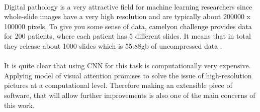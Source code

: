 \paragraph{}
Digital pathology is a very attractive field for machine learning researchers
since whole-slide images have a very high resolution and are typically about 200000 x 100000 pixels.
To give you some sense of data, camelyon challenge provides data for 200 patients,
where each patient has 5 different slides. It means that in total they release
about 1000 slides which is 55.88gb of uncompressed data \cite{CAMEL}.

\paragraph{}
It is quite clear that using CNN for this task is computationally very expensive.
Applying model of visual attention promises to solve the issue of
high-resolution pictures at a computational level.
Therefore making an extensible piece of software, that will allow further
improvements is also one of the main concerns of this work.




